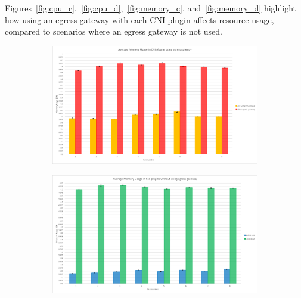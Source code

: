 Figures~\ref{fig:cpu_c},~\ref{fig:cpu_d},~\ref{fig:memory_c}, and~\ref{fig:memory_d} highlight how using an egress gateway with each CNI plugin affects resource usage, compared to scenarios where an egress gateway is not used.
\begin{figure}[H]
    \centering
    \begin{subfigure}[b]{0.45\textwidth}
        \includegraphics[width=\textwidth]{plots/egress/memory_egress.png}
        \caption{}
        \label{fig:memory_a}
    \end{subfigure}
    \hfill
    \begin{subfigure}[b]{0.45\textwidth}
        \includegraphics[width=\textwidth]{plots/egress/memory_base.png}
        \caption{}
        \label{fig:memory_b}
    \end{subfigure}
    
    \vspace{10pt}
    

\end{figure}
